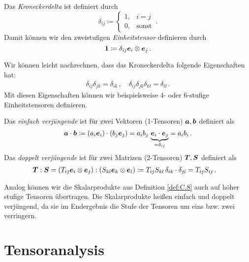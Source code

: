 \begin{defi}\label{def:C.6}
Das \textit{Kroneckerdelta} ist definiert durch
\[
	\delta_{ij} \coloneqq \begin{cases}
						1, & i = j \\
						0, & \text{sonst}
					\end{cases} \, .
\]
Damit können wir den zweistufigen \textit{Einheitstensor} definieren durch
\[
	\boldsymbol 1\coloneqq \delta_{ij} \boldsymbol e_i \otimes \boldsymbol e_j \, .
\]
\end{defi}

\begin{bem}\label{bem:C.7}
Wir können leicht nachrechnen, dass das Kroneckerdelta folgende Eigenschaften hat:
\begin{align*}
	\delta_{ij} \delta_{jk} = \delta_{ik} \, , \quad \delta_{ij}\delta_{jk}\delta_{kl} = \delta_{il} \, .
\end{align*}
Mit diesen Eigenschaften können wir beispielsweise 4- oder 6-stufige Einheitstensoren definieren.
\end{bem}

\begin{defi}[Skalarprodukte]\label{def:C.8}
Das \textit{einfach verjüngende } ist für zwei Vektoren (1-Tensoren) $\boldsymbol a, \boldsymbol b$ definiert als
\[
	\boldsymbol a \cdot \boldsymbol b \coloneqq (a_i \boldsymbol e_i)\cdot (b_j \boldsymbol e_j) = a_i b_j \, \underbrace{\boldsymbol e_i \cdot \boldsymbol e_j}_{=\delta_{ij}} = a_i b_i \, .
\]
Das \textit{doppelt verjüngende } ist für zwei Matrizen (2-Tensoren) $\boldsymbol T,\boldsymbol S$ definiert als
\begin{align*}
	\boldsymbol T : \boldsymbol S & = (T_{ij} \boldsymbol e_i \otimes \boldsymbol e_j) : (S_{kl} \boldsymbol e_k \otimes \boldsymbol e_l)\coloneqq T_{ij} S_{kl} \,  \delta_{ik} \cdot \delta_{jl} 
	 = T_{ij}S_{ij} \, .
\end{align*}
\end{defi}

\begin{bem}\label{bem:C.9}
Analog können wir die Skalarprodukte aus Definition \ref{def:C.8} auch auf höher stufige Tensoren übertragen. Die Skalarprodukte heißen einfach und doppelt verjüngend, da sie im Endergebnis die Stufe der Tensoren um eins bzw. zwei verringern.
\end{bem}



\section{Tensoranalysis}
\label{kap:C.2}

